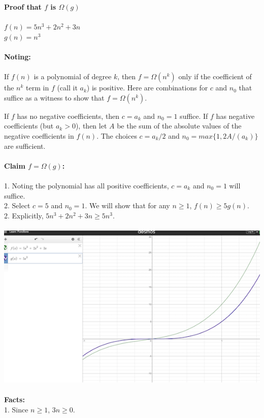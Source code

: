 \documentclass[OPONE]{example}
\begin{document}
\begin{list}{}{}
	\textbf{Proof that $f$ is $\Omega(g)$} \\ 
	\\
	$f(n) = 5n^{3} + 2n^{2} + 3n$ \\
	$g(n) = n^{3}$ \\
	\\
	\textbf{Noting: }\\
	\\
	If $f(n)$ is a polynomial of degree $k$, then $f = \Omega(n^{k})$ only if the coefficient of the $n^{k}$ term in $f$ (call it $a_{k}$) is positive. Here are combinations for $c$ and $n_{0}$ that suffice as a witness to show that $f = \Omega(n^{k})$.
	
	If $f$ has no negative coefficients, then $c = a_{k}$ and $n_{0} = 1$ suffice.
	If $f$ has negative coefficients (but $a_{k} > 0$), then let $A$ be the sum of the absolute values of the negative coefficients in $f(n)$. The choices $c = a_{k}/2$ and $n_{0} = max\{1, 2A/(a_{k})\}$ are sufficient. \\
	\\
	\textbf{Claim $f = \Omega(g)$: }\\
	\\
	1. Noting the polynomial has all positive coefficients, $c = a_{k}$ and $n_{0} = 1$ will suffice. \\
	2. Select $c = 5$ and $n_{0} = 1$.  We will show that for any $n \geq 1$, $f(n) \geq 5g(n)$. \\
	2. Explicitly, $5n^{3} + 2n^{2} + 3n \geq 5n^{3}$.\\
	\\
	\includegraphics{grapha2} \\ 
	\\
	\textbf{Facts:} \\
	1. Since $n \geq 1$, $3n \geq 0$.\\

\end{list}
\end{document}

